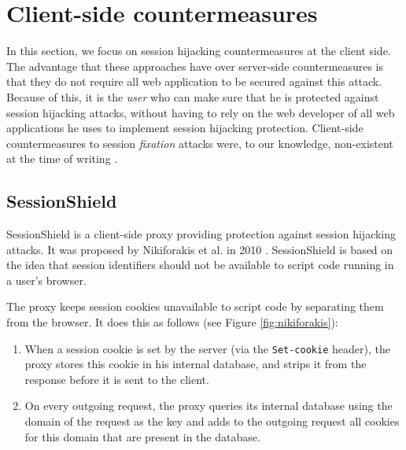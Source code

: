 \section{Client-side countermeasures}

In this section, we focus on session hijacking countermeasures at the client side. The advantage that these approaches have over server-side countermeasures is that they do not require all web application to be secured against this attack. Because of this, it is the \emph{user} who can make sure that he is protected against session hijacking attacks, without having to rely on the web developer of all web applications he uses to implement session hijacking protection. Client-side countermeasures to session \emph{fixation} attacks were, to our knowledge, non-existent at the time of writing \cite{Bonne2011}.

\subsection{SessionShield}\label{sessionshield} %

SessionShield is a client-side proxy providing protection against session hijacking attacks. It was proposed by Nikiforakis et al. in 2010 \cite{Nikiforakis2010}. SessionShield is based on the idea that session identifiers should not be available to script code running in a user's browser.

The proxy keeps session cookies unavailable to script code by separating them from the browser. It does this as follows (see Figure \ref{fig:nikiforakis}):
\begin{enumerate}
	\item When a session cookie is set by the server (via the \texttt{Set-cookie} header), the proxy stores this cookie in his internal database, and strips it from the response before it is sent to the client.
	\item On every outgoing request, the proxy queries its internal database using the domain of the request as the key and adds to the outgoing request all cookies for this domain that are present in the database.
\end{enumerate}


